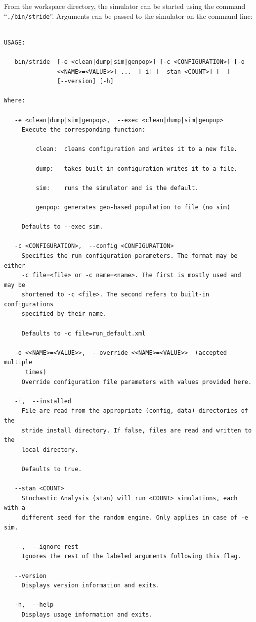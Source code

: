 From the workspace directory, the simulator can be started  using the command \mbox{``\texttt{./bin/stride}''}. Arguments can be passed to the simulator on the command line:
\begin{verbatim}

USAGE: 
 
   bin/stride  [-e <clean|dump|sim|genpop>] [-c <CONFIGURATION>] [-o
               <<NAME>=<VALUE>>] ...  [-i] [--stan <COUNT>] [--]
               [--version] [-h]
               
Where: 
 
   -e <clean|dump|sim|genpop>,  --exec <clean|dump|sim|genpop>
     Execute the corresponding function:  
 
         clean:  cleans configuration and writes it to a new file.  
 
         dump:   takes built-in configuration writes it to a file.  
 
         sim:    runs the simulator and is the default.  
 
         genpop: generates geo-based population to file (no sim)
 
     Defaults to --exec sim.
 
   -c <CONFIGURATION>,  --config <CONFIGURATION>
     Specifies the run configuration parameters. The format may be either
     -c file=<file> or -c name=<name>. The first is mostly used and may be
     shortened to -c <file>. The second refers to built-in configurations
     specified by their name.
 
     Defaults to -c file=run_default.xml
 
   -o <<NAME>=<VALUE>>,  --override <<NAME>=<VALUE>>  (accepted multiple
      times)
     Override configuration file parameters with values provided here.
 
   -i,  --installed
     File are read from the appropriate (config, data) directories of the
     stride install directory. If false, files are read and written to the
     local directory. 
 
     Defaults to true.
 
   --stan <COUNT>
     Stochastic Analysis (stan) will run <COUNT> simulations, each with a
     different seed for the random engine. Only applies in case of -e sim.
 
   --,  --ignore_rest
     Ignores the rest of the labeled arguments following this flag.
 
   --version
     Displays version information and exits.
 
   -h,  --help
     Displays usage information and exits.

\end{verbatim}

